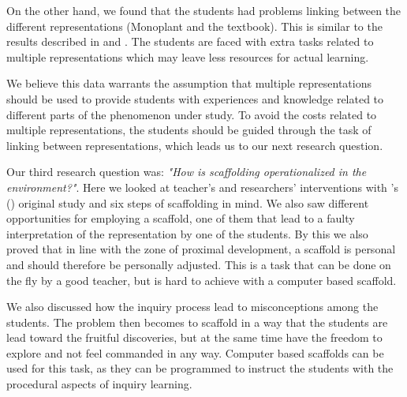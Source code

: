 On the other hand, we found that the students had problems linking between the different representations (Monoplant and the textbook). This is similar to the results described in \citet{ainsworth1999functions} and \citet{van2006supporting}. The students are faced with extra tasks related to multiple representations which may leave less resources for actual learning. 

We believe this data warrants the assumption that multiple representations should be used to provide students with experiences and knowledge related to different parts of the phenomenon under study. To avoid the costs related to multiple representations, the students should be guided through the task of linking between representations, which leads us to our next research question.






Our third research question was: \emph{"How is scaffolding operationalized in the environment?"}.
Here we looked at teacher's and researchers' interventions with \citeauthor{wood1976role}'s (\citeyear{wood1976role}) original study and six steps of scaffolding in mind. We also saw different opportunities for employing a scaffold, one of them that lead to a faulty interpretation of the representation by one of the students. By this we also proved that in line with the zone of proximal development, a scaffold is personal and should therefore be personally adjusted. This is a task that can be done on the fly by a good teacher, but is hard to achieve with a computer based scaffold. 

We also discussed how the inquiry process lead to misconceptions among the students. The problem then becomes to scaffold in a way that the students are lead toward the fruitful discoveries, but at the same time have the freedom to explore and not feel commanded in any way. Computer based scaffolds can be used for this task, as they can be programmed to instruct the students with the procedural aspects of inquiry learning. 

